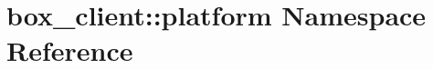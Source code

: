 \hypertarget{namespacebox__client_1_1platform}{
\section{box\_\-client::platform Namespace Reference}
\label{namespacebox__client_1_1platform}
}
